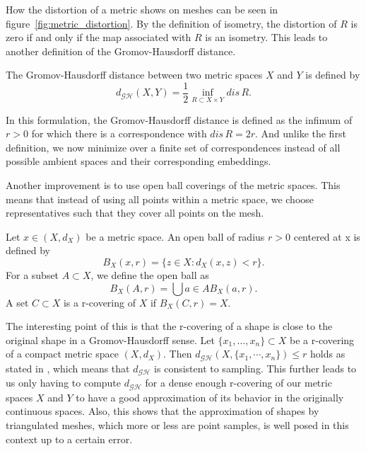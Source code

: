How the distortion of a metric shows on meshes can be seen in figure~\ref{fig:metric_distortion}.
By the definition of isometry, the distortion of $R$ is zero if and only if the map associated with $R$ is an isometry.
This leads to another definition of the Gromov-Hausdorff distance.
\begin{mydef}
	The Gromov-Hausdorff distance between two metric spaces $X$ and $Y$ is defined by
	\begin{equation}
		d_\mathcal{GH}(X,Y) = \frac{1}{2} \inf_{R \subset X \times Y} dis \, R.
		\label{eq:gromov_hausdorff}
	\end{equation}
\end{mydef}
In this formulation, the Gromov-Hausdorff distance is defined as the infimum of $r > 0$ for which there is a correspondence with $dis\,R = 2r$.
And unlike the first definition, we now minimize over a finite set of correspondences instead of all possible ambient spaces and their corresponding embeddings.

Another improvement is to use open ball coverings of the metric spaces.
This means that instead of using all points within a metric space, we choose representatives such that they cover all points on the mesh.
\begin{mydef}
	Let $x \in (X,d_X)$ be a metric space. An open ball of radius $r > 0$ centered at x is defined by
	$$B_X(x,r) = \{z\in X:d_X(x,z) < r\}.$$
	For a subset $A \subset X$, we define the open ball as
	$$B_X(A,r) = \bigcup{a\in A} B_X(a,r).$$
	A set $C\subset X$ is a r-covering of $X$ if $B_X(C,r) = X$.
\end{mydef}
The interesting point of this is that the r-covering of a shape is close to the original shape in a Gromov-Hausdorff sense.
Let $\{x_1,\ldots,x_n\}\subset X$ be a r-covering of a compact metric space $(X,d_X)$.
Then $d_\mathcal{GH}(X,\{x_1,\cdots,x_n\}) \le r$ holds as stated in \cite{burago2001course}, which means that $d_\mathcal{GH}$ is consistent to sampling.
This further leads to us only having to compute $d_\mathcal{GH}$ for a dense enough r-covering of our metric spaces $X$ and $Y$ to have a good approximation of its behavior in the originally continuous spaces.
Also, this shows that the approximation of shapes by triangulated meshes, which more or less are point samples, is well posed in this context up to a certain error.

